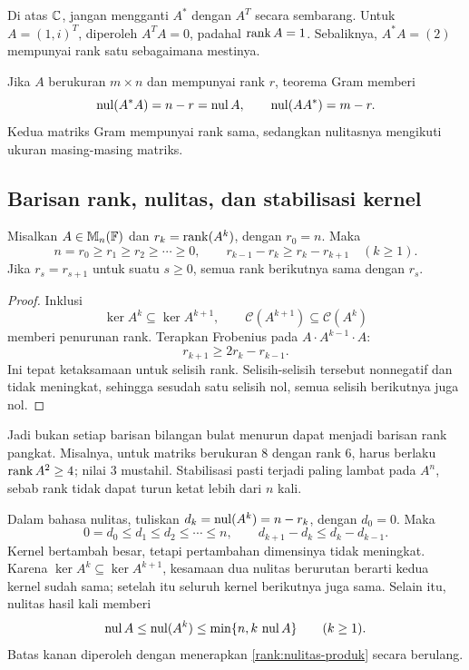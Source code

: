 \begin{remark}
    Di atas $\mathbb{C}$, jangan mengganti $A^*$ dengan $A^T$ secara sembarang.
    Untuk $A=(1,i)^T$, diperoleh $A^TA=0$, padahal $\operatorname{rank} A=1$.
    Sebaliknya, $A^*A=(2)$ mempunyai rank satu sebagaimana mestinya.
\end{remark}

Jika $A$ berukuran $m\times n$ dan mempunyai rank $r$, teorema Gram memberi
\[
    \operatorname{nul}(A^*A)=n-r=\operatorname{nul} A,\qquad \operatorname{nul}(AA^*)=m-r.
\]
Kedua matriks Gram mempunyai rank sama, sedangkan nulitasnya mengikuti
ukuran masing-masing matriks.

\subsection{Barisan rank, nulitas, dan stabilisasi kernel}

\begin{teorema}
    Misalkan $A\in\mathbb{M}_n(\mathbb{F})$ dan $r_k=\operatorname{rank}(A^k)$, dengan $r_0=n$.
    Maka
    \[
        n=r_0\ge r_1\ge r_2\ge\cdots\ge0,
        \qquad r_{k-1}-r_k\ge r_k-r_{k+1}\quad(k\ge1).
    \]
    Jika $r_s=r_{s+1}$ untuk suatu $s\ge0$, semua rank berikutnya
    sama dengan $r_s$.
\end{teorema}
\begin{proof}
    Inklusi
    \[
        \ker A^k\subseteq\ker A^{k+1},\qquad
        \mathcal C(A^{k+1})\subseteq\mathcal C(A^k)
    \]
    memberi penurunan rank. Terapkan Frobenius pada
    $A\cdot A^{k-1}\cdot A$:
    \[
        r_{k+1}\ge2r_k-r_{k-1}.
    \]
    Ini tepat ketaksamaan untuk selisih rank.
    Selisih-selisih tersebut nonnegatif dan tidak meningkat, sehingga
    sesudah satu selisih nol, semua selisih berikutnya juga nol.
\end{proof}

Jadi bukan setiap barisan bilangan bulat menurun dapat menjadi barisan
rank pangkat. Misalnya, untuk matriks berukuran $8$ dengan rank $6$,
harus berlaku $\operatorname{rank} A^2\ge4$; nilai $3$ mustahil.
Stabilisasi pasti terjadi paling lambat pada $A^n$, sebab rank tidak
dapat turun ketat lebih dari $n$ kali.

Dalam bahasa nulitas, tuliskan $d_k=\operatorname{nul}(A^k)=n-r_k$, dengan $d_0=0$.
Maka
\[
    0=d_0\le d_1\le d_2\le\cdots\le n,\qquad
    d_{k+1}-d_k\le d_k-d_{k-1}.
\]
Kernel bertambah besar, tetapi pertambahan dimensinya tidak meningkat.
Karena $\ker A^k\subseteq\ker A^{k+1}$, kesamaan dua nulitas berurutan
berarti kedua kernel sudah sama; setelah itu seluruh kernel berikutnya
juga sama. Selain itu, nulitas hasil kali memberi
\[
    \operatorname{nul} A\le\operatorname{nul}(A^k)\le\min\{n,k\,\operatorname{nul} A\}\qquad(k\ge1).
\]
Batas kanan diperoleh dengan menerapkan
\autoref{rank:nulitas-produk} secara berulang.

